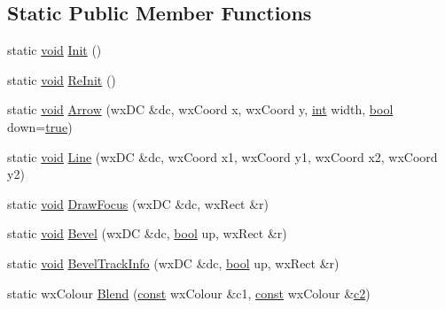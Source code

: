 \subsection*{Static Public Member Functions}
\begin{DoxyCompactItemize}
\item 
static \hyperlink{sound_8c_ae35f5844602719cf66324f4de2a658b3}{void} \hyperlink{class_a_color_a8a046b6440aca3d28ad9f64e1ee2ddfc}{Init} ()
\item 
static \hyperlink{sound_8c_ae35f5844602719cf66324f4de2a658b3}{void} \hyperlink{class_a_color_a605fbacd9ef5d6104a652b7451b1ca03}{Re\+Init} ()
\item 
static \hyperlink{sound_8c_ae35f5844602719cf66324f4de2a658b3}{void} \hyperlink{class_a_color_a054ceaee334fe7aeb2600cd300ae4d5e}{Arrow} (wx\+DC \&dc, wx\+Coord x, wx\+Coord y, \hyperlink{xmltok_8h_a5a0d4a5641ce434f1d23533f2b2e6653}{int} width, \hyperlink{mac_2config_2i386_2lib-src_2libsoxr_2soxr-config_8h_abb452686968e48b67397da5f97445f5b}{bool} down=\hyperlink{mac_2config_2i386_2lib-src_2libsoxr_2soxr-config_8h_a41f9c5fb8b08eb5dc3edce4dcb37fee7}{true})
\item 
static \hyperlink{sound_8c_ae35f5844602719cf66324f4de2a658b3}{void} \hyperlink{class_a_color_a37c16741ff103f9bc70a0c4591ddde05}{Line} (wx\+DC \&dc, wx\+Coord x1, wx\+Coord y1, wx\+Coord x2, wx\+Coord y2)
\item 
static \hyperlink{sound_8c_ae35f5844602719cf66324f4de2a658b3}{void} \hyperlink{class_a_color_af26c79694559e99331d39049090afe06}{Draw\+Focus} (wx\+DC \&dc, wx\+Rect \&r)
\item 
static \hyperlink{sound_8c_ae35f5844602719cf66324f4de2a658b3}{void} \hyperlink{class_a_color_ae7ebc3263eb6f2213020c39e5bb607a0}{Bevel} (wx\+DC \&dc, \hyperlink{mac_2config_2i386_2lib-src_2libsoxr_2soxr-config_8h_abb452686968e48b67397da5f97445f5b}{bool} up, wx\+Rect \&r)
\item 
static \hyperlink{sound_8c_ae35f5844602719cf66324f4de2a658b3}{void} \hyperlink{class_a_color_a9113deb34fdd4021fefe975070b6d2e1}{Bevel\+Track\+Info} (wx\+DC \&dc, \hyperlink{mac_2config_2i386_2lib-src_2libsoxr_2soxr-config_8h_abb452686968e48b67397da5f97445f5b}{bool} up, wx\+Rect \&r)
\item 
static wx\+Colour \hyperlink{class_a_color_a3a78c6c12adf25bbe54b4e7a968f608a}{Blend} (\hyperlink{getopt1_8c_a2c212835823e3c54a8ab6d95c652660e}{const} wx\+Colour \&c1, \hyperlink{getopt1_8c_a2c212835823e3c54a8ab6d95c652660e}{const} wx\+Colour \&\hyperlink{convtest_8m_a09ab2f3b6c61c793c7b6d24912b2cea0}{c2})

\end{DoxyCompactItemize}
